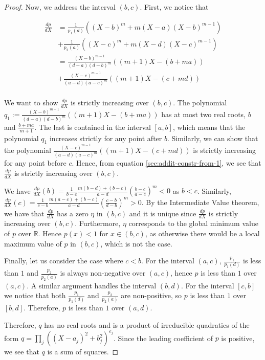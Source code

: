 \documentclass[preprint,12pt,authoryear]{elsarticle}
\newtheorem{proof}[theorem]{Proof}
\begin{document}
\begin{proof}
  Now, we address the interval $(b, c)$. First, we notice that
  \vspace{-5mm}

  \begin{equation}
    \label{sec:addit-constr-from-1}
    \begin{split}
      \frac{dp}{dX}
      &= \frac{1}{p_1(d)}((X-b)^{m} + m (X-a)(X-b)^{m-1})\\
      &+
        \frac{1}{p_2(a)}((X-c)^{m} + m (X-d)(X-c)^{m-1})\\
      &= \frac{(X - b)^{m-1}}{(d-a)(d-b)^{m}}((m+1)X - (b + m a))\\
      &+
        \frac{(X-c)^{m-1}}{(a-d)(a-c)^{m}}((m+1)X - (c + m d))\\
    \end{split}
  \end{equation}

  We want to show $\frac{dp}{dX}$ is strictly increasing over $(b, c)$.  The
  polynomial $q_1 := \frac{(X - b)^{m-1}}{(d-a)(d-b)^{m}}((m+1)X - (b + m a))$
  has at most two real roots, $b$ and $\frac{b + ma}{m+1}$. The last is
 contained in the interval $[a, b]$, which means that the polynomial $q_1$ increases
 strictly for any point after $b$. Similarly, we can show that the
  polynomial $\frac{(X-c)^{m-1}}{(a-d)(a-c)^{m}}((m+1)X - (c + m d))$ is
  strictly increasing for any point before $c$. Hence, from equation
  \eqref{sec:addit-constr-from-1}, we see that $\frac{dp}{dX}$ is strictly
  increasing over $(b, c)$.

  We have
  $\frac{dp}{dX}(b) = \frac{1}{b-c} \frac{m(b-d) + (b - c)}{a-d}
  (\frac{b-c}{a-c})^{m} < 0$ as $b < c$. Similarly,
  $\frac{dp}{dX}(c) = \frac{1}{c-b} \frac{m(a-c) + (b - c)}{a-d}
  (\frac{c-b}{d-b})^{m} > 0$. By the Intermediate Value theorem, we have that
  $\frac{dp}{dX}$ has a zero $\eta$ in $(b, c)$ and it is unique since
  $\frac{dp}{dX}$ is strictly increasing over $(b, c)$. Furthermore, $\eta$
  corresponds to the global minimum value of $p$ over $\mathbb{R}$. Hence
  $p(x) < 1$ for $x \in (b, c)$, as otherwise there would be a local maximum
  value of $p$ in $(b, c)$, which is not the case.

  Finally, let us consider the case where $c < b$. For the interval $(a, c)$,
  $\frac{p_1}{p_1(d)}$ is less than $1$ and $\frac{p_2}{p_2(a)}$
  is always non-negative over $(a, c)$, hence $p$ is less than $1$ over $(a,
  c)$. A similar argument handles the interval $(b, d)$. For the interval $[c,
  b]$ we notice that both $\frac{p_1}{p_1(d)}$ and $\frac{p_2}{p_2(a)}$ are
  non-positive, so $p$ is less than $1$ over $[b, d]$. Therefore, $p$ is less
  than $1$ over $(a, d)$.

  Therefore, $q$ has no real roots and is a product of irreducible quadratics
  of the form $q = \prod_{j}^{}{((X - a_j)^2 + b_j^2)^{e_j}}$. Since the leading
  coefficient of $p$ is positive, we see that $q$ is a sum of squares.
\end{proof}
\end{document}
